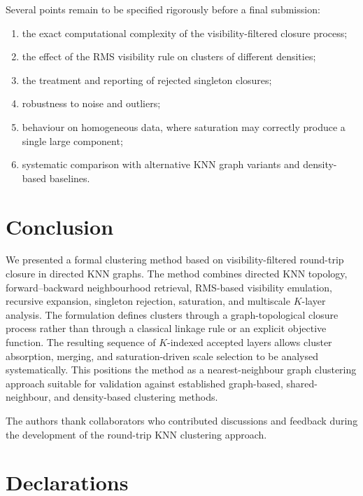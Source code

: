 \documentclass[pdflatex,sn-mathphys-num]{sn-jnl}
\begin{document}
Several points remain to be specified rigorously before a final submission:
\begin{enumerate}
    \item the exact computational complexity of the visibility-filtered closure process;
    \item the effect of the RMS visibility rule on clusters of different densities;
    \item the treatment and reporting of rejected singleton closures;
    \item robustness to noise and outliers;
    \item behaviour on homogeneous data, where saturation may correctly produce a single large component;
    \item systematic comparison with alternative KNN graph variants and density-based baselines.
\end{enumerate}

\section{Conclusion}\label{sec:conclusion}

We presented a formal clustering method based on visibility-filtered round-trip closure in directed KNN graphs. The method combines directed KNN topology, forward--backward neighbourhood retrieval, RMS-based visibility emulation, recursive expansion, singleton rejection, saturation, and multiscale $K$-layer analysis. The formulation defines clusters through a graph-topological closure process rather than through a classical linkage rule or an explicit objective function. The resulting sequence of $K$-indexed accepted layers allows cluster absorption, merging, and saturation-driven scale selection to be analysed systematically. This positions the method as a nearest-neighbour graph clustering approach suitable for validation against established graph-based, shared-neighbour, and density-based clustering methods.

\backmatter


The authors thank collaborators who contributed discussions and feedback during the development of the round-trip KNN clustering approach.

\section*{Declarations}
\end{document}
